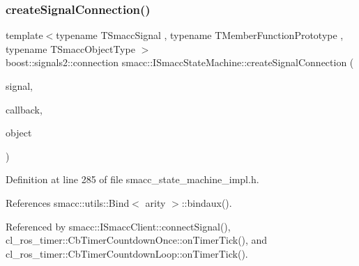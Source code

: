 \subsubsection{\texorpdfstring{create\+Signal\+Connection()}{createSignalConnection()}}
{\footnotesize\ttfamily template$<$typename T\+Smacc\+Signal , typename T\+Member\+Function\+Prototype , typename T\+Smacc\+Object\+Type $>$ \\
boost\+::signals2\+::connection smacc\+::\+I\+Smacc\+State\+Machine\+::create\+Signal\+Connection (\begin{DoxyParamCaption}\item[{T\+Smacc\+Signal \&}]{signal,  }\item[{T\+Member\+Function\+Prototype}]{callback,  }\item[{T\+Smacc\+Object\+Type $\ast$}]{object }\end{DoxyParamCaption})}



Definition at line 285 of file smacc\+\_\+state\+\_\+machine\+\_\+impl.\+h.



References smacc\+::utils\+::\+Bind$<$ arity $>$\+::bindaux().



Referenced by smacc\+::\+I\+Smacc\+Client\+::connect\+Signal(), cl\+\_\+ros\+\_\+timer\+::\+Cb\+Timer\+Countdown\+Once\+::on\+Timer\+Tick(), and cl\+\_\+ros\+\_\+timer\+::\+Cb\+Timer\+Countdown\+Loop\+::on\+Timer\+Tick().


